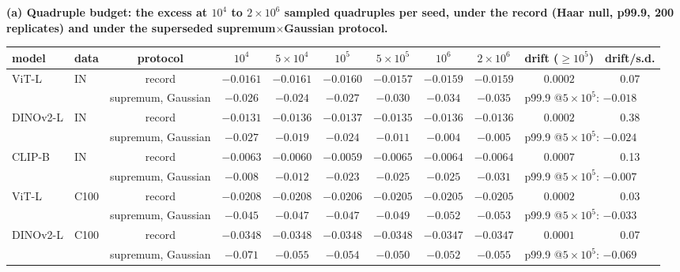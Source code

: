 \begin{table}[H]
\centering
\scriptsize
\setlength{\tabcolsep}{2.4pt}
\begingroup
\noindent\textbf{(a) Quadruple budget: the excess at $10^4$ to $2{\times}10^6$ sampled quadruples per seed, under the record (Haar null, p99.9, 200 replicates) and under the superseded supremum$\times$Gaussian protocol.}\par\vspace{1.5pt}
\setlength{\tabcolsep}{2.2pt}
\begin{tabular}{llccccccc|cc}
\toprule
model & data & protocol & $10^4$ & $5{\times}10^4$ & $10^5$ & $5{\times}10^5$ & $10^6$ & $2{\times}10^6$ & drift ($\ge10^5$) & drift/s.d. \\
\midrule
ViT-L & IN & record & $-0.0161$ & $-0.0161$ & $-0.0160$ & $-0.0157$ & $-0.0159$ & $-0.0159$ & $0.0002$ & 0.07 \\
 & & supremum, Gaussian & $-0.026$ & $-0.024$ & $-0.027$ & $-0.030$ & $-0.034$ & $-0.035$ & \multicolumn{2}{l}{p99.9 @$5{\times}10^5$: $-0.018$} \\
DINOv2-L & IN & record & $-0.0131$ & $-0.0136$ & $-0.0137$ & $-0.0135$ & $-0.0136$ & $-0.0136$ & $0.0002$ & 0.38 \\
 & & supremum, Gaussian & $-0.027$ & $-0.019$ & $-0.024$ & $-0.011$ & $-0.004$ & $-0.005$ & \multicolumn{2}{l}{p99.9 @$5{\times}10^5$: $-0.024$} \\
CLIP-B & IN & record & $-0.0063$ & $-0.0060$ & $-0.0059$ & $-0.0065$ & $-0.0064$ & $-0.0064$ & $0.0007$ & 0.13 \\
 & & supremum, Gaussian & $-0.008$ & $-0.012$ & $-0.023$ & $-0.025$ & $-0.025$ & $-0.031$ & \multicolumn{2}{l}{p99.9 @$5{\times}10^5$: $-0.007$} \\
ViT-L & C100 & record & $-0.0208$ & $-0.0208$ & $-0.0206$ & $-0.0205$ & $-0.0205$ & $-0.0205$ & $0.0002$ & 0.03 \\
 & & supremum, Gaussian & $-0.045$ & $-0.047$ & $-0.047$ & $-0.049$ & $-0.052$ & $-0.053$ & \multicolumn{2}{l}{p99.9 @$5{\times}10^5$: $-0.033$} \\
DINOv2-L & C100 & record & $-0.0348$ & $-0.0348$ & $-0.0348$ & $-0.0348$ & $-0.0347$ & $-0.0347$ & $0.0001$ & 0.07 \\
 & & supremum, Gaussian & $-0.071$ & $-0.055$ & $-0.054$ & $-0.050$ & $-0.052$ & $-0.055$ & \multicolumn{2}{l}{p99.9 @$5{\times}10^5$: $-0.069$} \\

\end{tabular}
\end{table}
